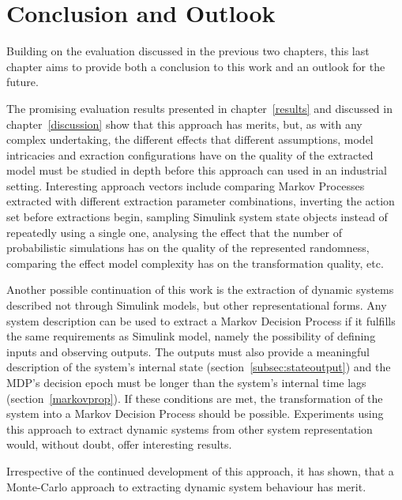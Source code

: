 \chapter{Conclusion and Outlook}
\label{conclusionoutlook}

Building on the evaluation discussed in the previous two chapters, this last chapter aims to provide both a conclusion to this work and an outlook for the future.

The promising evaluation results presented in chapter~\ref{results} and discussed in chapter~\ref{discussion} show that this approach has merits, but, as with any complex undertaking, the different effects that different assumptions, model intricacies and exraction configurations have on the quality of the extracted model must be studied in depth before this approach can used in an industrial setting. Interesting approach vectors include comparing Markov Processes extracted with different extraction parameter combinations, inverting the action set before extractions begin, sampling Simulink system state objects instead of repeatedly using a single one, analysing the effect that the number of probabilistic simulations has on the quality of the represented randomness, comparing the effect model complexity has on the transformation quality, etc.

Another possible continuation of this work is the extraction of dynamic systems described not through Simulink models, but other representational forms. Any system description can be used to extract a Markov Decision Process if it fulfills the same requirements as Simulink model, namely the possibility of defining inputs and observing outputs. The outputs must also provide a meaningful description of the system's internal state (section~\ref{subsec:stateoutput}) and the MDP's decision epoch must be longer than the system's internal time lags (section~\ref{markovprop}). If these conditions are met, the transformation of the system into a Markov Decision Process should be possible. Experiments using this approach to extract dynamic systems from other system representation would, without doubt, offer interesting results.

Irrespective of the continued development of this approach, it has shown, that a Monte-Carlo approach to extracting dynamic system behaviour has merit.
